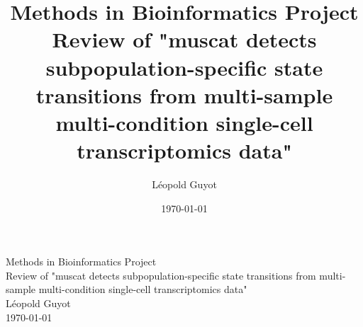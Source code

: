 \documentclass[a4paper, 11pt, twocolumn]{article}
\title{\Large Methods in Bioinformatics Project \\
\huge Review of "muscat detects subpopulation-specific state transitions from multi-sample multi-condition single-cell transcriptomics data"}
\author{Léopold Guyot}
\date{\today}
\begin{document}
\pagestyle{fancy}
\setlength{\headheight}{25.0117pt}
\fancyhead{}\fancyfoot{}
\fancyfoot[R]{\thepage}



\onecolumn
\vspace*{-1.5cm}  %
\begin{center}
	{\Large Methods in Bioinformatics Project}\\[1ex]
	{\huge Review of "muscat detects subpopulation-specific state transitions from multi-sample multi-condition single-cell transcriptomics data"}\\[2ex]
	{\large Léopold Guyot}\\[1ex]
	{\today}
\end{center}
 
\thispagestyle{plainfooter}



\end{document}
